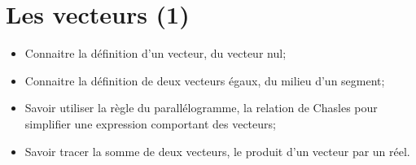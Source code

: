 \chapter{Les vecteurs (1)}\label{ChLesVecteurs}

\begin{acquis}
\begin{itemize}
\item Connaitre la définition d'un vecteur, du vecteur nul;
\item Connaitre la définition de deux  vecteurs égaux, du milieu d'un segment;
\item Savoir utiliser la règle du parallélogramme, la relation de Chasles pour simplifier une expression comportant des vecteurs;
\item Savoir tracer la somme de deux vecteurs, le produit d'un vecteur par un réel.
\end{itemize}
\end{acquis}



\exercicesbase
\begin{colonne*exercice}

\end{colonne*exercice}




\connaissances




\pagebreak



